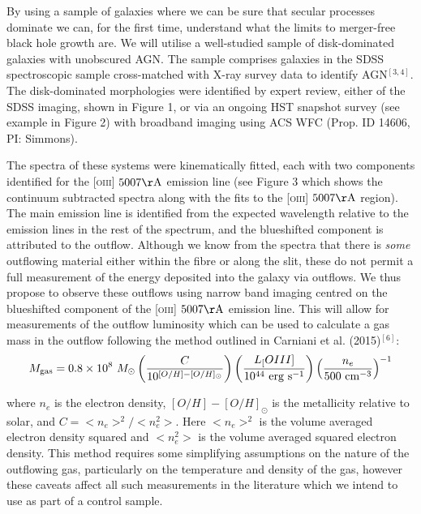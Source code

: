 \documentclass[12pt]{article}
\begin{document}
By using a sample of galaxies where we can be sure that secular processes dominate we can, for the first time, understand what the limits to merger-free black hole growth are. We will utilise a well-studied sample of disk-dominated galaxies with unobscured AGN. The sample comprises galaxies in the SDSS spectroscopic sample cross-matched with X-ray survey data to identify AGN$^{[3,4]}$. The disk-dominated morphologies were identified by expert review, either of the SDSS imaging, shown in Figure 1, or via an ongoing HST snapshot survey (see example in Figure 2) with broadband imaging using ACS WFC (Prop. ID 14606, PI: Simmons). 
\vspace{0.25em}

The spectra of these systems were kinematically fitted, each with two components identified for the \textsc{[oiii]} $5007\rm{\AA}$ emission line (see Figure 3 which shows the continuum subtracted spectra along with the fits to the \textsc{[oiii]} $5007\rm{\AA}$ region). The main emission line is identified from the expected wavelength relative to the emission lines in the rest of the spectrum, and the blueshifted component is attributed to the outflow. Although we know from the spectra that there is \emph{some} outflowing material either within the fibre or along the slit, these do not permit a full measurement of the energy deposited into the galaxy via outflows. We thus propose to observe these outflows using narrow band imaging centred on the blueshifted component of the \textsc{[oiii]} $5007\rm{\AA}$ emission line. This will allow for measurements of the outflow luminosity which can be used to calculate a gas mass in the outflow following the method outlined in Carniani et al. (2015)$^{[6]}$:
\begin{equation}
M_{\rm{gas}} = 0.8 \times 10^8~M_{\odot} \left( \frac{C}{10^{[O/H] - [O/H]_{\odot}}} \right) \left( \frac{L_[OIII]}{10^{44}~\rm{erg}~\rm{s}^{-1}} \right) \left( \frac{n_e}{500~\rm{cm}^{-3}} \right)^{-1}
\end{equation}

where $n_e$ is the electron density, $[O/H] - [O/H]_{\odot}$ is the metallicity relative to solar, and $C = <n_e>^2 / <n_e^2>$. Here $<n_e>^2$ is the volume averaged electron density squared and $<n_e^2>$ is the volume averaged squared electron density. This method requires some simplifying assumptions on the nature of the outflowing gas, particularly on the temperature and density of the gas, however these caveats affect all such measurements in the literature which we intend to use as part of a control sample. 
\vspace{0.25em}
\end{document}
